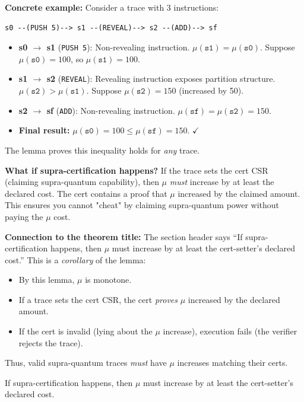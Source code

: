 \textbf{Concrete example:}
Consider a trace with 3 instructions:
\begin{verbatim}
s0 --(PUSH 5)--> s1 --(REVEAL)--> s2 --(ADD)--> sf
\end{verbatim}
\begin{itemize}
    \item \textbf{s0 $\to$ s1} (\texttt{PUSH 5}): Non-revealing instruction. $\mu(\texttt{s1}) = \mu(\texttt{s0})$. Suppose $\mu(\texttt{s0}) = 100$, so $\mu(\texttt{s1}) = 100$.
    
    \item \textbf{s1 $\to$ s2} (\texttt{REVEAL}): Revealing instruction exposes partition structure. $\mu(\texttt{s2}) > \mu(\texttt{s1})$. Suppose $\mu(\texttt{s2}) = 150$ (increased by 50).
    
    \item \textbf{s2 $\to$ sf} (\texttt{ADD}): Non-revealing instruction. $\mu(\texttt{sf}) = \mu(\texttt{s2}) = 150$.
    
    \item \textbf{Final result:} $\mu(\texttt{s0}) = 100 \leq \mu(\texttt{sf}) = 150$. $\checkmark$
\end{itemize}
The lemma proves this inequality holds for \textit{any} trace.

\textbf{What if supra-certification happens?} If the trace sets the cert CSR (claiming supra-quantum capability), then $\mu$ \textit{must} increase by at least the declared cost. The cert contains a proof that $\mu$ increased by the claimed amount. This ensures you cannot "cheat" by claiming supra-quantum power without paying the $\mu$ cost.

\textbf{Connection to the theorem title:} The section header says ``If supra-certification happens, then $\mu$ must increase by at least the cert-setter's declared cost.'' This is a \textit{corollary} of the lemma:
\begin{itemize}
    \item By this lemma, $\mu$ is monotone.
    \item If a trace sets the cert CSR, the cert \textit{proves} $\mu$ increased by the declared amount.
    \item If the cert is invalid (lying about the $\mu$ increase), execution fails (the verifier rejects the trace).
\end{itemize}
Thus, valid supra-quantum traces \textit{must} have $\mu$ increases matching their certs.


If supra-certification happens, then $\mu$ must increase by at least the cert-setter's declared cost.

